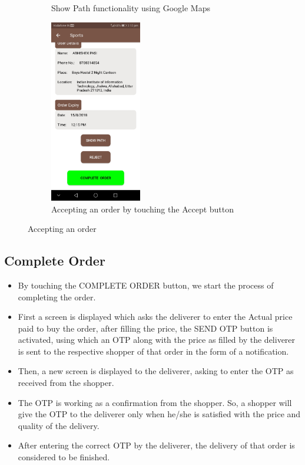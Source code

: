 \documentclass{report}
\begin{document}
\begin{figure}[h!]
\begin{subfigure}[h!]{.24\textwidth}
\caption{\centering \tiny Show Path functionality using Google Maps}
\end{subfigure}
\begin{subfigure}[h!]{.24\textwidth}
\centering
\includegraphics[width=4cm]{order_accepted.jpg}
\caption{\centering \tiny Accepting an order by touching the Accept button}
\end{subfigure}
\caption{\tiny Accepting an order} 
\label{fig:NASA_Logo}
\end{figure}


\subsection{Complete Order}
\begin{itemize}
\item By touching the COMPLETE ORDER button, we start the process of completing the order.
\item First a screen is displayed which asks the deliverer to enter the Actual price paid to buy the order, after filling the price, the SEND OTP button is activated, using which an OTP along with the price as filled by the deliverer is sent to the respective shopper of that order in the form  of a notification.
\item Then, a new screen is displayed to the deliverer, asking to enter the OTP as received from the shopper.
\item The OTP is working as a confirmation from the shopper. So, a shopper will give the OTP to the deliverer only when he/she is satisfied with the price and quality of the delivery.
\item After entering the correct OTP by the deliverer, the delivery of that order is considered to be finished.
\end{itemize}
\end{document}
